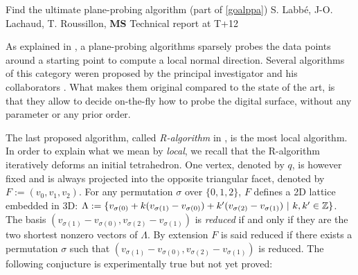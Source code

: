 

   {Find the ultimate plane-probing algorithm (part of \ref{goalppa})}
   {S. Labb\'{e}, J-O. Lachaud, T. Roussillon, \textbf{MS}}
   {Technical report at T+12}
\medskip

As explained in , a plane-probing algorithms sparsely probes the data points
around a starting point to compute a local normal direction. Several algorithms of this category
weren proposed by the principal investigator and his collaborators
\cite{LPRTCS2016, LPRDGCI2016, LPRJMIV2017}.
What makes them original compared to the state of the art, is that they allow to decide on-the-fly
how to probe the digital surface, without any parameter or any prior order.

The last proposed algorithm, called \emph{R-algorithm} in \cite{LPRJMIV2017}, is the most
local algorithm. In order to explain what we mean by \emph{local}, we recall that
the R-algorithm iteratively deforms an initial tetrahedron. One vertex, denoted by $q$,
is however fixed and is always projected into the opposite triangular facet, denoted by
$F := (v_0,v_1,v_2)$. For any permutation $\sigma$ over $\{0,1,2\}$, $F$ defines a 2D
lattice embedded in 3D:
$\Lambda := \{ v_{\sigma(0)} + k (v_{\sigma(1)}-v_{\sigma(0)}) + k' (v_{\sigma(2)}-v_{\sigma(1)}) \ | \ k,k' \in {\ensuremath\mathbb{Z}} \}$. 
The basis $(v_{\sigma(1)}-v_{\sigma(0)}, v_{\sigma(2)}-v_{\sigma(1)})$ is \emph{reduced} if and only
if they are the two shortest nonzero vectors of $\Lambda$. By extension $F$ is said reduced
if there exists a permutation $\sigma$ such that $(v_{\sigma(1)}-v_{\sigma(0)}, v_{\sigma(2)}-v_{\sigma(1)})$
is reduced. The following conjucture is experimentally true but not yet proved:

